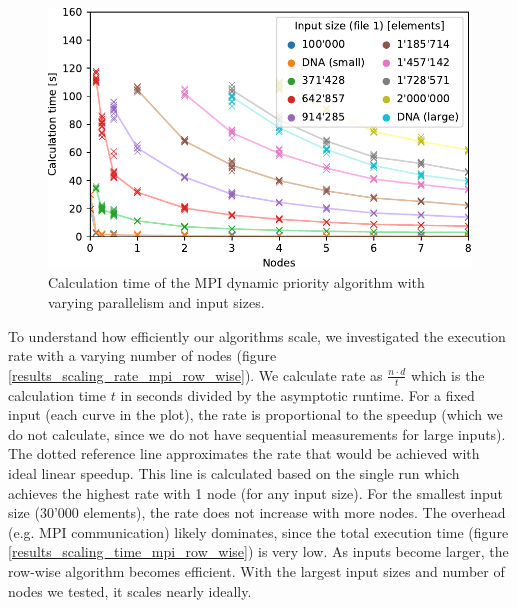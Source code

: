 \begin{figure}[hbt]\centering
  \includegraphics[width=\linewidth]{images/scaling-time-mpi-dynamic-priority.pdf}
  \caption{Calculation time of the MPI dynamic priority algorithm with varying parallelism and input sizes.}
  \label{results_scaling_time_mpi_dynamic_priority}
\end{figure}

To understand how efficiently our algorithms scale, we investigated the execution rate with a varying number of nodes (figure \ref{results_scaling_rate_mpi_row_wise}). We calculate rate as $\frac{n \cdot d}{t}$ which is the calculation time $t$ in seconds divided by the asymptotic runtime. For a fixed input (each curve in the plot), the rate is proportional to the speedup \cite{moreland2015formal} (which we do not calculate, since we do not have sequential measurements for large inputs). The dotted reference line approximates the rate that would be achieved with ideal linear speedup. This line is calculated based on the single run which achieves the highest rate with 1 node (for any input size). For the smallest input size (30'000 elements), the rate does not increase with more nodes. The overhead (e.g. MPI communication) likely dominates, since the total execution time (figure \ref{results_scaling_time_mpi_row_wise}) is very low. As inputs become larger, the row-wise algorithm becomes efficient. With the largest input sizes and number of nodes we tested, it scales nearly ideally.

